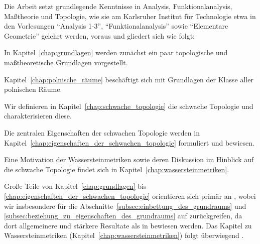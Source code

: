 \documentclass[../thesis/thesis.tex]{subfiles}
\begin{document}
	Die Arbeit setzt grundlegende Kenntnisse in Analysis, Funktionalanalysis, Maßtheorie und Topologie, wie sie am Karlsruher 
	Institut für Technologie etwa in den Vorlesungen
	\enquote{Analysis 1-3}, \enquote{Funktionalanalysis} sowie \enquote{Elementare Geometrie} gelehrt werden, voraus und gliedert sich wie folgt:
	\begin{itemizethm}
		\item In Kapitel~\ref{chap:grundlagen} werden zunächst ein paar topologische und maßtheoretische Grundlagen vorgestellt.
		\item Kapitel~\ref{chap:polnische_räume} beschäftigt sich mit Grundlagen der Klasse aller polnischen Räume.
		\item Wir definieren in Kapitel~\ref{chap:schwache_topologie} die schwache Topologie und charakterisieren diese.
		\item Die zentralen Eigenschaften der schwachen Topologie werden in Kapitel~\ref{chap:eigenschaften_der_schwachen_topologie}
		formuliert und bewiesen.
		\item Eine Motivation der Wassersteinmetriken sowie deren Diskussion im Hinblick auf die schwache Topologie findet sich in Kapitel~\ref{chap:wassersteinmetriken}.
	\end{itemizethm}

	Große Teile von Kapitel~\ref{chap:grundlagen} bis \ref{chap:eigenschaften_der_schwachen_topologie} orientieren sich primär an \cite[Section 4.14]{Simon.2015}, 
	wobei wir insbesondere für die Abschnitte~\ref{subsec:einbettung_des_grundraums} und \ref{subsec:beziehung_zu_eigenschaften_des_grundraums} auf \cite{Varadarajan.1958}
	zurückgreifen, da dort allgemeinere und stärkere Resultate als in \cite{Simon.2015} bewiesen werden. Das Kapitel zu Wassersteinmetriken (Kapitel~\ref{chap:wassersteinmetriken})
	folgt überwiegend \cite[Chapter 4-6]{Villani.2009}.
	
	
	
\end{document}
